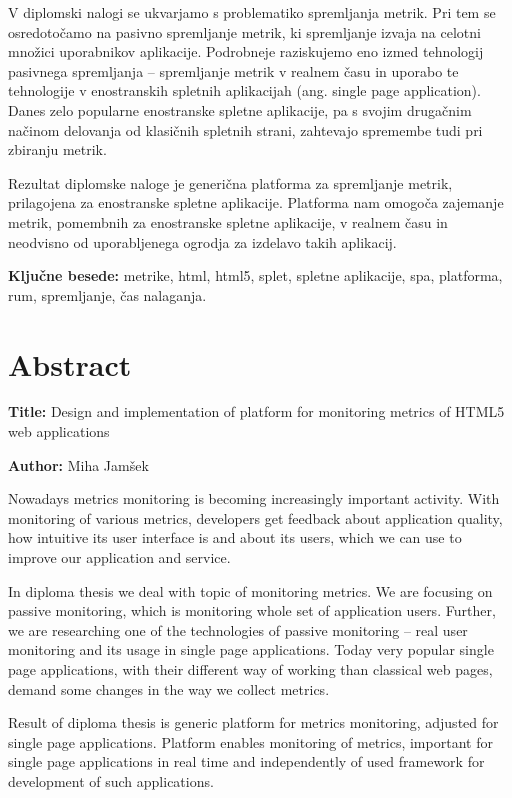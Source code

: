 \documentclass[a4paper, 12pt]{book}
\newcommand{\ttitleEn}{Design and implementation of platform for monitoring metrics of HTML5 web applications}
\newcommand{\tauthor}{Miha Jamšek}
\newcommand{\tkeywords}{metrike, html, html5, splet, spletne aplikacije, spa, platforma, rum, spremljanje, čas nalaganja}
\newcommand{\clearemptydoublepage}{\newpage{\pagestyle{empty}\cleardoublepage}}
\begin{document}
V diplomski nalogi se ukvarjamo s problematiko spremljanja metrik. Pri tem se osredotočamo na pasivno spremljanje metrik, ki spremljanje izvaja na celotni množici uporabnikov aplikacije. Podrobneje raziskujemo eno izmed tehnologij pasivnega spremljanja – spremljanje metrik v realnem času in uporabo te tehnologije v enostranskih spletnih aplikacijah (ang. single page application). Danes zelo popularne enostranske spletne aplikacije, pa s svojim drugačnim načinom delovanja od klasičnih spletnih strani, zahtevajo spremembe tudi pri zbiranju metrik.

Rezultat diplomske naloge je generična platforma za spremljanje metrik, prilagojena za enostranske spletne aplikacije. Platforma nam omogoča zajemanje metrik, pomembnih za enostranske spletne aplikacije, v realnem času in neodvisno od uporabljenega ogrodja za izdelavo takih aplikacij.

\bigskip

\noindent\textbf{Ključne besede:} \tkeywords.
\clearemptydoublepage

\chapter*{Abstract}

\noindent\textbf{Title:} \ttitleEn
\bigskip

\noindent\textbf{Author:} \tauthor
\bigskip

\noindent
Nowadays metrics monitoring is becoming increasingly important activity. With monitoring of various metrics, developers get feedback about application quality, how intuitive its user interface is and about its users, which we can use to improve our application and service.

In diploma thesis we deal with topic of monitoring metrics. We are focusing on passive monitoring, which is monitoring whole set of application users. Further, we are researching one of the technologies of passive monitoring – real user monitoring and its usage in single page applications. Today very popular single page applications, with their different way of working than classical web pages, demand some changes in the way we collect metrics.

Result of diploma thesis is generic platform for metrics monitoring, adjusted for single page applications. Platform enables monitoring of metrics, important for single page applications in real time and independently of used framework for development of such applications.
\end{document}
